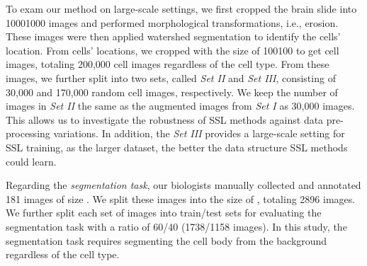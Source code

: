 \documentclass[10pt,twocolumn,letterpaper]{article}
\begin{document}
To exam our method on large-scale settings, we first cropped the brain slide into 10001000 images and performed morphological transformations, i.e., erosion. These images were then applied watershed segmentation to identify the cells' location. From cells' locations, we cropped with the size of 100100 to get cell images, totaling 200,000 cell images regardless of the cell type. From these images, we further split into two sets, called \textit{Set II} and \textit{Set III}, consisting of 30,000 and 170,000 random cell images, respectively. We keep the number of images in \textit{Set II} the same as the augmented images from \textit{Set I} as 30,000 images. This allows us to investigate the robustness of SSL methods against data pre-processing variations. In addition, the \textit{Set III} provides a large-scale setting for SSL training, as the larger dataset, the better the data structure SSL methods could learn.



Regarding the {\textit{segmentation task}}, our biologists manually collected and annotated 181 images of size . We split these images into the size of , totaling 2896 images. We further split each set of images into train/test sets for evaluating the segmentation task with a ratio of 60/40 (1738/1158 images). In this study, the segmentation task requires segmenting the cell body from the background regardless of the cell type.
\end{document}
